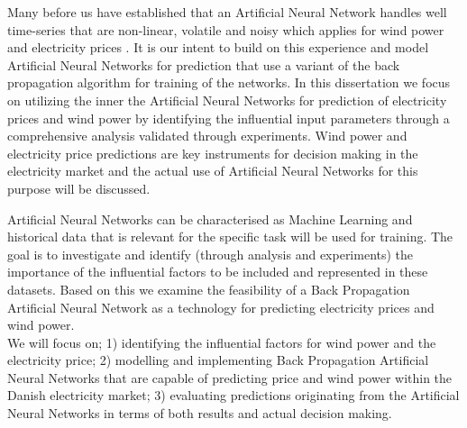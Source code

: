 Many before us have established that an Artificial Neural Network handles well time-series that are non-linear, volatile and noisy which applies for wind power and electricity prices \cite{stockForecasting,pjmForecast,yamin2004adaptive,windForecastPortugal}. It is our intent to build on this experience and model Artificial Neural Networks for prediction that use a variant of the back propagation algorithm for training of the networks. In this dissertation we focus on utilizing the inner the Artificial Neural Networks for prediction of electricity prices and wind power by identifying the influential input parameters through a comprehensive analysis validated through experiments. Wind power and electricity price predictions are key instruments for decision making in the electricity market\cite{dayAheadImpactOfWindPowerForecasts,21} and the actual use of Artificial Neural Networks for this purpose will be discussed.  

Artificial Neural Networks can be characterised as Machine Learning\cite{18} and historical data that is relevant for the specific task will be used for training. The goal is to investigate and identify (through analysis and experiments) the importance of the influential factors to be included and represented in these datasets. Based on this we examine the feasibility of a Back Propagation Artificial Neural Network as a technology for predicting electricity prices and wind power.
\\[0.5cm]
We will focus on; 1) identifying the influential factors for wind power and the electricity price; 2) modelling and implementing Back Propagation Artificial Neural Networks that are capable of predicting price and wind power within the Danish electricity market; 3) evaluating predictions originating from the Artificial Neural Networks in terms of both results and actual decision making.